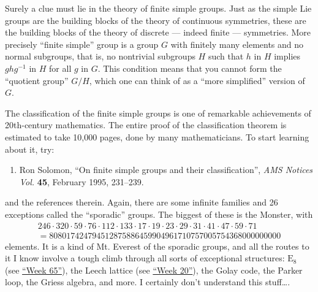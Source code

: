 \documentclass{article}
\def\tightlist{}
\begin{document}
Surely a clue must lie in the theory of finite simple groups. Just as
the simple Lie groups are the building blocks of the theory of
continuous symmetries, these are the building blocks of the theory of
discrete --- indeed finite --- symmetries. More precisely ``finite
simple'' group is a group \(G\) with finitely many elements and no
normal subgroups, that is, no nontrivial subgroups \(H\) such that \(h\)
in \(H\) implies \(ghg^{-1}\) in \(H\) for all \(g\) in \(G\). This
condition means that you cannot form the ``quotient group'' \(G/H\),
which one can think of as a ``more simplified'' version of \(G\).

The classification of the finite simple groups is one of remarkable
achievements of 20th-century mathematics. The entire proof of the
classification theorem is estimated to take 10,000 pages, done by many
mathematicians. To start learning about it, try:

\begin{enumerate}
\def\labelenumi{\arabic{enumi})}
\setcounter{enumi}{3}
\tightlist
\item
  Ron Solomon, ``On finite simple groups and their classification'',
  \emph{AMS Notices Vol.} \textbf{45}, February 1995, 231--239.
\end{enumerate}

and the references therein. Again, there are some infinite families and
26 exceptions called the ``sporadic'' groups. The biggest of these is
the Monster, with \[
  \begin{gathered}
    246\cdot 320\cdot 59\cdot 76\cdot 112\cdot 133\cdot 17\cdot 19\cdot 23\cdot 29\cdot 31\cdot 41\cdot 47\cdot 59\cdot 71
    \\= 808017424794512875886459904961710757005754368000000000
  \end{gathered}
\] elements. It is a kind of Mt. Everest of the sporadic groups, and all
the routes to it I know involve a tough climb through all sorts of
exceptional structures: \(\mathrm{E}_8\) (see
\protect\hyperlink{week65}{``Week 65''}), the Leech lattice (see
\protect\hyperlink{week20}{``Week 20''}), the Golay code, the Parker
loop, the Griess algebra, and more. I certainly don't understand this
stuff\ldots.
\end{document}

